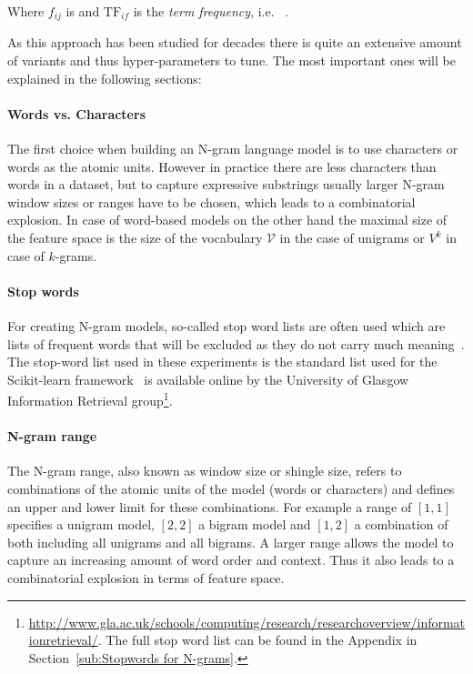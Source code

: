 Where $f_{ij}$ is  and $\text{TF}_{if}$ is the \emph{term frequency}, i.e.   ~\cite[Chapter 1.3.1, p.~8]{Leskovec:2014aa}.

As this approach has been studied for decades there is quite an extensive amount of variants and thus hyper-parameters to tune. The most important ones will be explained in the following sections:

\paragraph{Words vs. Characters} The first choice when building an N-gram language model is to use characters or words as the atomic units. However in practice there are less characters than words in a dataset, but to capture expressive substrings usually larger N-gram window sizes or ranges have to be chosen, which leads to a combinatorial explosion. In case of word-based models on the other hand the maximal size of the feature space is the size of the vocabulary $\mathcal{V}$ in the case of unigrams or $V^k$ in case of $k$-grams.

\paragraph{Stop words}
\label{par:Stop words}
For creating N-gram models, so-called stop word lists are often used which are lists of frequent words that will be excluded as they do not carry much meaning~\cite[Chapter 1.3.1, p.~7]{Leskovec:2014aa}. The stop-word list used in these experiments is the standard list used for the Scikit-learn framework~\cite{Pedregosa:2011aa} is available online by the University of Glasgow Information Retrieval group\footnote{\url{http://www.gla.ac.uk/schools/computing/research/researchoverview/informationretrieval/}. The full stop word list can be found in the Appendix in Section~\ref{sub:Stopwords for N-grams}.}.

\paragraph{N-gram range} The N-gram range, also known as window size or shingle size, refers to combinations of the atomic units of the model (words or characters) and defines an upper and lower limit for these combinations. For example a range of $[1,1]$ specifies a unigram model, $[2,2]$ a bigram model and $[1,2]$ a combination of both including all unigrams and all bigrams.
A larger range allows the model to capture an increasing amount of word order and context. Thus it also leads to a combinatorial explosion in terms of feature space.

